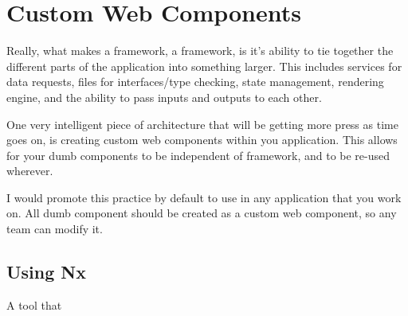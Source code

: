 \chapter{ Custom Web Components }
Really, what makes a framework, a framework, is it's ability to tie together the different parts of the application into something larger. This includes services for data requests, files for interfaces/type checking, state management, rendering engine, and the ability to pass inputs and outputs to each other.

One very intelligent piece of architecture that will be getting more press as time goes on, is creating custom web components within you application. This allows for your dumb components to be independent of framework, and to be re-used wherever. 

I would promote this practice by default to use in any application that you work on. All dumb component should be created as a custom web component, so any team can modify it. 

\section{Using Nx}
A tool that 